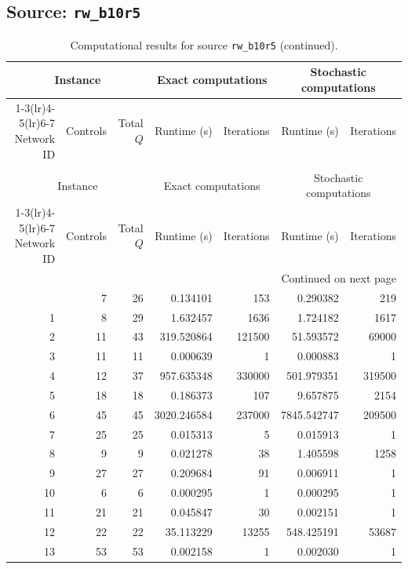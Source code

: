 \documentclass{article}
\begin{document}
\begin{landscape}
\subsection*{Source: \texttt{rw\_b10r5}}

\begin{longtable}{rrrrrrr}
\caption{Computational results for source \texttt{rw\_b10r5}.}\\
\toprule
\multicolumn{3}{c}{Instance} & \multicolumn{2}{c}{Exact computations} & \multicolumn{2}{c}{Stochastic computations} \\
\cmidrule(lr){1-3}\cmidrule(lr){4-5}\cmidrule(lr){6-7}
Network ID & Controls & Total $Q$ & Runtime (s) & Iterations & Runtime (s) & Iterations \\
\midrule
\endfirsthead
\caption[]{Computational results for source \texttt{rw\_b10r5} (continued).}\\
\toprule
\multicolumn{3}{c}{Instance} & \multicolumn{2}{c}{Exact computations} & \multicolumn{2}{c}{Stochastic computations} \\
\cmidrule(lr){1-3}\cmidrule(lr){4-5}\cmidrule(lr){6-7}
Network ID & Controls & Total $Q$ & Runtime (s) & Iterations & Runtime (s) & Iterations \\
\midrule
\endhead
\midrule
\multicolumn{7}{r}{Continued on next page} \\
\endfoot
\bottomrule
\endlastfoot
0 & 7 & 26 & 0.134101 & 153 & 0.290382 & 219 \\
1 & 8 & 29 & 1.632457 & 1636 & 1.724182 & 1617 \\
2 & 11 & 43 & 319.520864 & 121500 & 51.593572 & 69000 \\
3 & 11 & 11 & 0.000639 & 1 & 0.000883 & 1 \\
4 & 12 & 37 & 957.635348 & 330000 & 501.979351 & 319500 \\
5 & 18 & 18 & 0.186373 & 107 & 9.657875 & 2154 \\
6 & 45 & 45 & 3020.246584 & 237000 & 7845.542747 & 209500 \\
7 & 25 & 25 & 0.015313 & 5 & 0.015913 & 1 \\
8 & 9 & 9 & 0.021278 & 38 & 1.405598 & 1258 \\
9 & 27 & 27 & 0.209684 & 91 & 0.006911 & 1 \\
10 & 6 & 6 & 0.000295 & 1 & 0.000295 & 1 \\
11 & 21 & 21 & 0.045847 & 30 & 0.002151 & 1 \\
12 & 22 & 22 & 35.113229 & 13255 & 548.425191 & 53687 \\
13 & 53 & 53 & 0.002158 & 1 & 0.002030 & 1 \\

\end{longtable}
\end{landscape}
\end{document}
